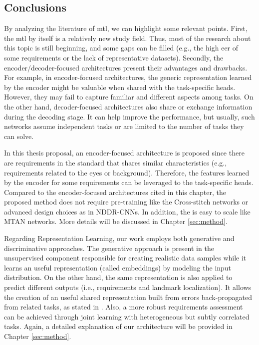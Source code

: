\subsection{Conclusions}

By analyzing the literature of \acl{mtl}, we can highlight some relevant points. First, the \acs{mtl} by itself is a relatively new study field. Thus, most of the research about this topic is still beginning, and some gaps can be filled (e.g., the high \acs{eer} of some requirements or the lack of representative datasets). Secondly, the encoder/decoder-focused architectures present their advantages and drawbacks. For example, in encoder-focused architectures, the generic representation learned by the encoder might be valuable when shared with the task-specific heads. However, they may fail to capture familiar and different aspects among tasks. On the other hand, decoder-focused architectures also share or exchange information during the decoding stage. It can help improve the performance, but usually, such networks assume independent tasks or are limited to the number of tasks they can solve. 

In this thesis proposal, an encoder-focused architecture is proposed since there are requirements in the \icao standard that shares similar characteristics (e.g., requirements related to the eyes or background). Therefore, the features learned by the encoder for some requirements can be leveraged to the task-specific heads.  Compared to the encoder-focused architectures cited in this chapter, the proposed method does not require pre-training like the Cross-stitch networks or advanced design choices as in NDDR-CNNs. In addition, the \methodname is easy to scale like MTAN networks. More details will be discussed in Chapter \ref{sec:method}.

Regarding Representation Learning, our work employs both generative and discriminative approaches. The generative approach is present in the unsupervised component responsible for creating realistic data samples while it learns an useful representation (called embeddings) by modeling the input distribution. On the other hand, the same representation is also applied to predict different outputs (i.e., requirements and landmark localization). It allows the creation of an useful shared representation built from errors back-propagated from related tasks, as stated in \citep{zhang2014facial}. Also, a more robust requirements assessment can be achieved through joint learning with heterogeneous but subtly correlated tasks. Again, a detailed explanation of our architecture will be provided in Chapter \ref{sec:method}.

